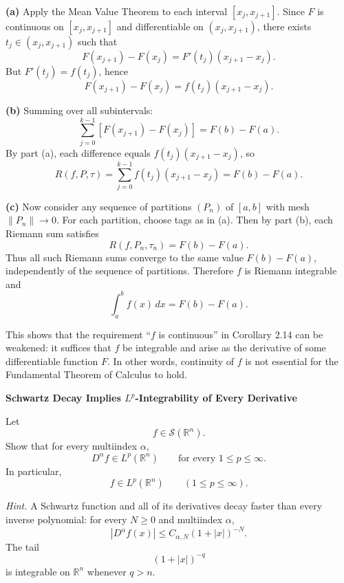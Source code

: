 \begin{solution}
\textbf{(a)}
	Apply the Mean Value Theorem to each interval $[x_j,x_{j+1}]$. Since $F$ is continuous on $[x_j,x_{j+1}]$ and differentiable on $(x_j,x_{j+1})$, there exists $t_j\in(x_j,x_{j+1})$ such that
	\[
	F(x_{j+1})-F(x_j)=F'(t_j)(x_{j+1}-x_j).
	\]
	But $F'(t_j)=f(t_j)$, hence
	\[
	F(x_{j+1})-F(x_j)=f(t_j)(x_{j+1}-x_j).
	\]

	\textbf{(b)}
	Summing over all subintervals:
	\[
	\sum_{j=0}^{k-1}[F(x_{j+1})-F(x_j)]=F(b)-F(a).
	\]
	By part (a), each difference equals $f(t_j)(x_{j+1}-x_j)$, so
	\[
	R(f,P,\tau)=\sum_{j=0}^{k-1} f(t_j)(x_{j+1}-x_j)=F(b)-F(a).
	\]

	\textbf{(c)}
	Now consider any sequence of partitions $(P_n)$ of $[a,b]$ with mesh $\|P_n\|\to 0$. For each partition, choose tags as in (a). Then by part (b), each Riemann sum satisfies
	\[
	R(f,P_n,\tau_n)=F(b)-F(a).
	\]
	Thus all such Riemann sums converge to the same value $F(b)-F(a)$, independently of the sequence of partitions. Therefore $f$ is Riemann integrable and
	\[
	\int_a^b f(x)\,dx=F(b)-F(a).
	\]

	This shows that the requirement ``$f$ is continuous'' in Corollary 2.14 can be weakened: it suffices that $f$ be integrable and arise as the derivative of some differentiable function $F$. In other words, continuity of $f$ is not essential for the Fundamental Theorem of Calculus to hold.
\end{solution}

\begin{problem}[CP-II-0212]
\label{prob:cp-ii-0212}
\textbf{Schwartz Decay Implies \(L^p\)-Integrability of Every Derivative}

\hspace*{1.5em}Let
\[
f\in\mathcal S(\mathbb R^n).
\]
Show that for every multiindex \(\alpha\),
\[
D^\alpha f\in L^p(\mathbb R^n)
\qquad
\text{for every }1\le p\le\infty.
\]
In particular,
\[
f\in L^p(\mathbb R^n)
\qquad
(1\le p\le\infty).
\]

\medskip
\noindent\emph{Hint.} A Schwartz function and all of its derivatives decay faster than every
inverse polynomial: for every \(N\ge0\) and multiindex \(\alpha\),
\[
|D^\alpha f(x)|
\le
C_{\alpha,N}(1+|x|)^{-N}.
\]
The tail
\[
(1+|x|)^{-q}
\]
is integrable on \(\mathbb R^n\) whenever \(q>n\).
\end{problem}

